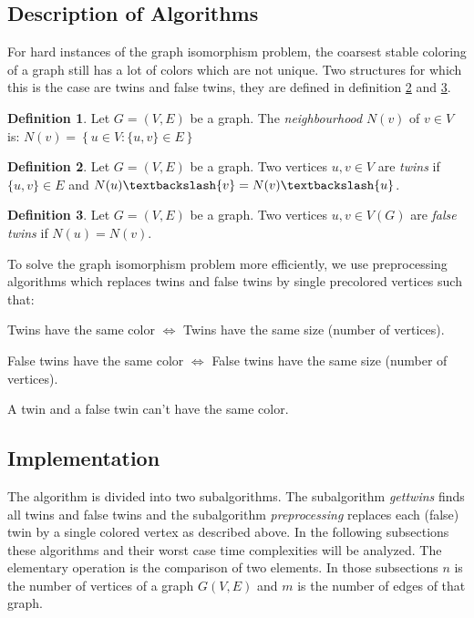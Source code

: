 \documentclass[twoside]{article}
\theoremstyle{definition}
\newtheorem{definition}{Definition}
\theoremstyle{plain}
\begin{document}
\begin{multicols}{2}
\section{Description of Algorithms}
For hard instances of the graph isomorphism problem, the coarsest stable coloring of a graph still has a lot of colors which are not unique. Two structures for which this is the case are twins and false twins, they are defined in definition \ref{deftwins} and \ref{deffalsetwins}.
\begin{definition}
Let $G = (V,E)$ be a graph. The \emph{neighbourhood} $N(v)$ of $v \in V$ is:
$N(v) = \left\{{u \in V : \{u,v\} \in E}\right\}$
\end{definition}
\begin{definition}\label{deftwins}
Let $G = (V,E)$ be a graph.
Two vertices $u, v \in V$ are \emph{twins} if $\{u,v\} \in E$ and $N(u)\textbackslash {v} = N(v)\textbackslash {u}$.
\end{definition}
\begin{definition}\label{deffalsetwins}
Let $G = (V,E)$ be a graph.
Two vertices $u, v \in V(G)$ are \emph{false twins} if $N(u) = N(v).$
\end{definition}

To solve the graph isomorphism problem more efficiently, we use preprocessing algorithms which replaces twins and false twins by single precolored vertices such that:
\begin{compactenum}
\item Twins have the same color $\iff$ Twins have the same size (number of vertices).
\item False twins have the same color $\iff$ False twins have the same size (number of vertices).
\item A twin and a false twin can't have the same color.
\end{compactenum}

\subsection{Implementation}
The algorithm is divided into two subalgorithms. The subalgorithm \textit{gettwins} finds all twins and false twins and the subalgorithm \textit{preprocessing} replaces each (false) twin by a single colored vertex as described above. In the following subsections these algorithms and their worst case time complexities will be analyzed. The elementary operation is the comparison of two elements. In those subsections $n$ is the number of vertices of a graph $G(V,E)$ and $m$ is the number of edges of that graph.


\end{multicols}
\end{document}
